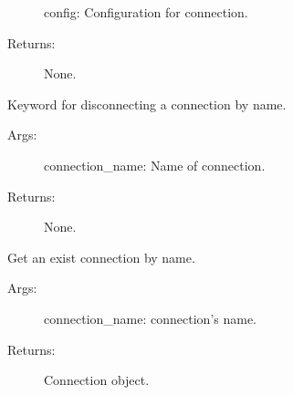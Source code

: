 \documentclass[letterpaper,10pt,english]{sphinxmanual}
\begin{document}
\begin{fulllineitems}
\begin{fulllineitems}
\begin{description}
\sphinxAtStartPar
config: Configuration for connection.

\item[{Returns:}] \leavevmode
\sphinxAtStartPar
None.

\end{description}

\end{fulllineitems}


\begin{fulllineitems}
\label{\detokenize{QConnectionLibrary:QConnectionLibrary.connection_manager.ConnectionManager.disconnect}}
\sphinxAtStartPar
Keyword for disconnecting a connection by name.
\begin{description}
\item[{Args:}] \leavevmode
\sphinxAtStartPar
connection\_name: Name of connection.

\item[{Returns:}] \leavevmode
\sphinxAtStartPar
None.

\end{description}

\end{fulllineitems}


\begin{fulllineitems}
\label{\detokenize{QConnectionLibrary:QConnectionLibrary.connection_manager.ConnectionManager.get_connection_by_name}}
\sphinxAtStartPar
Get an exist connection by name.
\begin{description}
\item[{Args:}] \leavevmode
\sphinxAtStartPar
connection\_name: connection’s name.

\item[{Returns:}] \leavevmode
\sphinxAtStartPar
Connection object.

\end{description}


\end{fulllineitems}
\end{fulllineitems}
\end{document}
